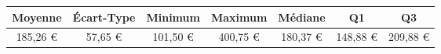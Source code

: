 \begin{tabular}{ccccccc}
    \toprule
    Moyenne & Écart-Type & Minimum & Maximum & Médiane & Q1 & Q3 \\
    \midrule
    185,26 \euro & 57,65 \euro & 101,50 \euro & 400,75 \euro & 180,37 \euro & 148,88 \euro & 209,88 \euro \\
    \bottomrule
\end{tabular}